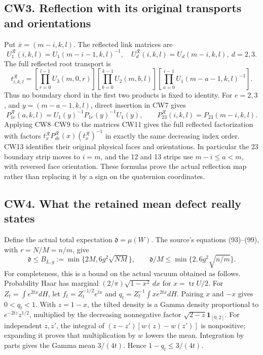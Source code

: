 \documentclass[11pt]{article}
\begin{document}
\subsection*{CW3. Reflection with its original transports and orientations}

Put \(\bar x=(m-i,k,l)\). The reflected link matrices are
\[
 U_1^{\mathcal R}(i,k,l)=U_1(m-i-1,k,l)^{-1},\quad
 U_d^{\mathcal R}(i,k,l)=U_d(m-i,k,l),\ d=2,3.              \tag{CW11}
\]
The full reflected root transport is
\[
 t^{\mathcal R}_{i,k,l}=
 \left[\prod_{r=0}^{l-1}U_3(m,0,r)\right]
 \left[\prod_{b=0}^{k-1}U_2(m,b,l)\right]
 \left[\prod_{a=0}^{i-1}U_1(m-a-1,k,l)^{-1}\right].        \tag{CW12}
\]
Thus no boundary chord in the first two products is fixed to
identity. For \(e=2,3\), and \(y=(m-a-1,k,l)\), direct insertion
in CW7 gives
\[
 P_{1e}^{\mathcal R}(a,k,l)
 =U_1(y)^{-1}P_{1e}(y)^{-1}U_1(y),\qquad
 P_{23}^{\mathcal R}(i,k,l)=P_{23}(m-i,k,l).                \tag{CW13}
\]
Applying CW8–CW9 to the matrices CW11 gives the full reflected
factorization with factors
\(t_x^{\mathcal R}P_{de}^{\mathcal R}(x)(t_x^{\mathcal R})^{-1}\)
in exactly the same decreasing index order. CW13 identifies their
original physical faces and orientations. In particular the 23
boundary strip moves to \(i=m\), and the 12 and 13 strips use
\(m-i\le a<m\), with reversed face orientation. These formulas
prove the actual reflection map rather than replacing it by a
sign on the quaternion coordinates.

\subsection*{CW4. What the retained mean defect really states}

Define the actual total expectation
\(\mathfrak d=\mu(W)\). The source's equations (93)–(99),
with \(r=N/M=n/m\), give
\[
 \mathfrak d\le B_{L,g}:=\min\{2M,6g^2\sqrt{NM}\},\qquad
 \mathfrak d/M\le\min\{2,6g^2\sqrt{n/m}\}.                \tag{CW14}
\]
For completeness, this is a bound on the actual vacuum obtained
as follows. Probability Haar has marginal
\((2/\pi)\sqrt{1-x^2}\,dx\) for \(x=\operatorname{tr}U/2\).
For \(Z_t=\int e^{2tx}dH\), let
\(f_t=Z_t^{-1/2}e^{tx}\) and
\(q_t=Z_t^{-1}\int xe^{2tx}dH\). Pairing \(x\) and \(-x\)
gives \(0<q_t<1\). With \(z=1-x\), the tilted density is a
Gamma density proportional to \(e^{-2tz}z^{1/2}\), multiplied
by the decreasing nonnegative factor
\(\sqrt{2-z}\mathbf1_{[0,2]}\). For independent \(z,z'\),
the integral of \((z-z')[w(z)-w(z')]\) is nonpositive; expanding
it proves that multiplication by \(w\) lowers the mean.
Integration by parts gives the Gamma mean \(3/(4t)\). Hence
\(1-q_t\le3/(4t)\).
\end{document}
